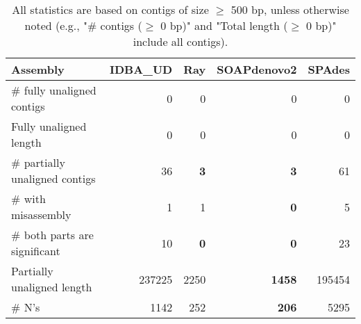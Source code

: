 \documentclass[12pt,a4paper]{article}
\begin{document}
\begin{table}[ht]
\begin{center}
\caption{All statistics are based on contigs of size $\geq$ 500 bp, unless otherwise noted (e.g., "\# contigs ($\geq$ 0 bp)" and "Total length ($\geq$ 0 bp)" include all contigs).}
\begin{tabular}{|l*{4}{|r}|}
\hline
Assembly & IDBA\_UD & Ray & SOAPdenovo2 & SPAdes \\ \hline
\# fully unaligned contigs & 0 & 0 & 0 & 0 \\ \hline
Fully unaligned length & 0 & 0 & 0 & 0 \\ \hline
\# partially unaligned contigs & 36 & {\bf 3} & {\bf 3} & 61 \\ \hline
\hspace{5mm}\# with misassembly & 1 & 1 & {\bf 0} & 5 \\ \hline
\hspace{5mm}\# both parts are significant & 10 & {\bf 0} & {\bf 0} & 23 \\ \hline
Partially unaligned length & 237225 & 2250 & {\bf 1458} & 195454 \\ \hline
\# N's & 1142 & 252 & {\bf 206} & 5295 \\ \hline
\end{tabular}
\end{center}
\end{table}
\end{document}
